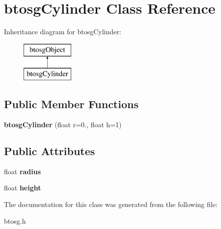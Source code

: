 \hypertarget{classbtosgCylinder}{}\section{btosg\+Cylinder Class Reference}
\label{classbtosgCylinder}
Inheritance diagram for btosg\+Cylinder\+:\begin{figure}[H]
\begin{center}
\leavevmode
\includegraphics[height=2.000000cm]{classbtosgCylinder}
\end{center}
\end{figure}
\subsection*{Public Member Functions}
\begin{DoxyCompactItemize}
\item 
\mbox{\label{classbtosgCylinder_a85e2517d8fd8a16ad7514f2f70cc1086}} 
{\bfseries btosg\+Cylinder} (float r=0., float h=1)
\end{DoxyCompactItemize}
\subsection*{Public Attributes}
\begin{DoxyCompactItemize}
\item 
\mbox{\label{classbtosgCylinder_a6589c522ac0b82880287f28e791acac0}} 
float {\bfseries radius}
\item 
\mbox{\label{classbtosgCylinder_a4fca9b21b059fdcb762b5e8ce8a3e0eb}} 
float {\bfseries height}
\end{DoxyCompactItemize}


The documentation for this class was generated from the following file\+:\begin{DoxyCompactItemize}
\item 
btosg.\+h\end{DoxyCompactItemize}
